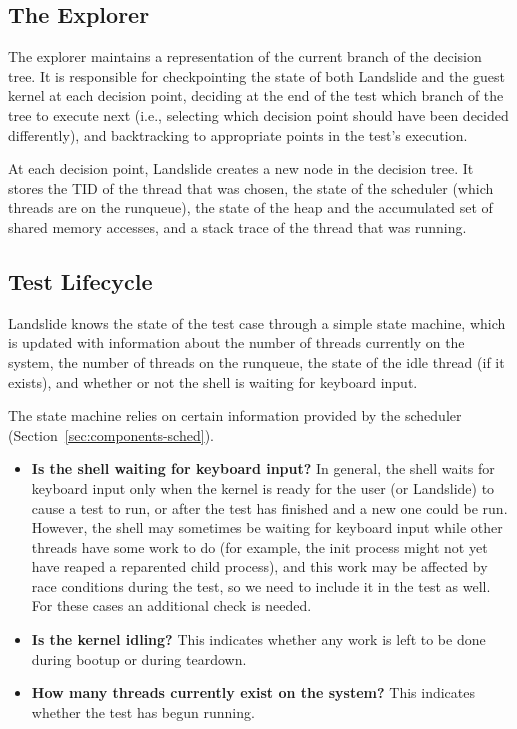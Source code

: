 \subsection{The Explorer}
\label{sec:components-explore}

The explorer maintains a representation of the current branch of the decision tree. It is responsible for checkpointing the state of both Landslide and the guest kernel at each decision point, deciding at the end of the test which branch of the tree to execute next (i.e., selecting which decision point should have been decided differently), and backtracking to appropriate points in the test's execution.

At each decision point, Landslide creates a new node in the decision tree. It stores the TID of the thread that was chosen, the state of the scheduler (which threads are on the runqueue), the state of the heap and the accumulated set of shared memory accesses, and a stack trace of the thread that was running.

\subsection{Test Lifecycle}
\label{sec:components-test}

Landslide knows the state of the test case through a simple state machine, which is updated with information about the number of threads currently on the system, the number of threads on the runqueue, the state of the idle thread (if it exists), and whether or not the shell is waiting for keyboard input.

The state machine relies on certain information provided by the scheduler (Section~\ref{sec:components-sched}).

\begin{itemize}
	\item {\bf Is the shell waiting for keyboard input?} In general, the shell waits for keyboard input only when the kernel is ready for the user (or Landslide) to cause a test to run, or after the test has finished and a new one could be run.
		However, the shell may sometimes be waiting for keyboard input while other threads have some work to do (for example, the init process might not yet have reaped a reparented child process), and this work may be affected by race conditions during the test, so we need to include it in the test as well. For these cases an additional check is needed.
	\item {\bf Is the kernel idling?} This indicates whether any work is left to be done during bootup or during teardown.
	\item {\bf How many threads currently exist on the system?} This indicates whether the test has begun running.
\end{itemize}

